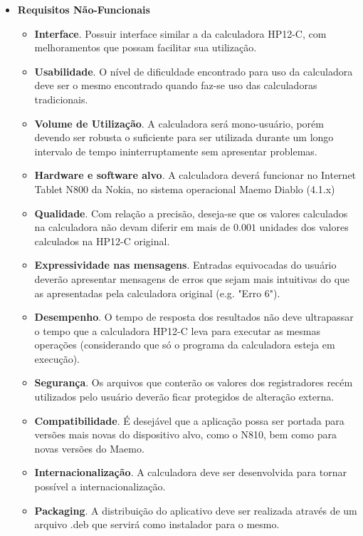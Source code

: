 \begin{itemize}
\begin{itemize}
	\end{itemize}
 \item \textbf{Requisitos Não-Funcionais}
	\begin{itemize}
	 \item \textbf{Interface}. Possuir interface similar a da calculadora HP12-C, com melhoramentos que possam facilitar sua utilização.
	 \item \textbf{Usabilidade}. O nível de dificuldade encontrado para uso da calculadora deve ser o mesmo encontrado quando faz-se uso das calculadoras tradicionais.
	 \item \textbf{Volume de Utilização}. A calculadora será mono-usuário, porém devendo ser robusta o suficiente para ser utilizada durante um longo intervalo de tempo ininterruptamente sem apresentar problemas.
	 \item \textbf{Hardware e software alvo}. A calculadora deverá funcionar no Internet Tablet N800 da Nokia, no sistema operacional Maemo Diablo (4.1.x) 
	 \item \textbf{Qualidade}. Com relação a precisão, deseja-se que os valores calculados na calculadora não devam diferir em mais de $0.001$ unidades dos valores calculados na HP12-C original.
	 \item \textbf{Expressividade nas mensagens}. Entradas equivocadas do usuário deverão apresentar mensagens de erros que sejam mais intuitivas do que as apresentadas pela calculadora original (e.g. "Erro 6").
	 \item \textbf{Desempenho}. O tempo de resposta dos resultados não deve ultrapassar o tempo que a calculadora HP12-C leva para executar as mesmas operações (considerando que só o programa da calculadora esteja em execução).
	 \item \textbf{Segurança}. Os arquivos que conterão os valores dos registradores recém utilizados pelo usuário deverão ficar protegidos de alteração externa.
	 \item \textbf{Compatibilidade}. É desejável que a aplicação possa ser portada para versões mais novas do dispositivo alvo, como o N810, bem como para novas versões do Maemo.
	 \item \textbf{Internacionalização}. A calculadora deve ser desenvolvida para tornar possível a internacionalização. 
	 \item \textbf{Packaging}. A distribuição do aplicativo deve ser realizada através de um arquivo .deb que servirá como instalador para o mesmo.
	\end{itemize}
\end{itemize}
